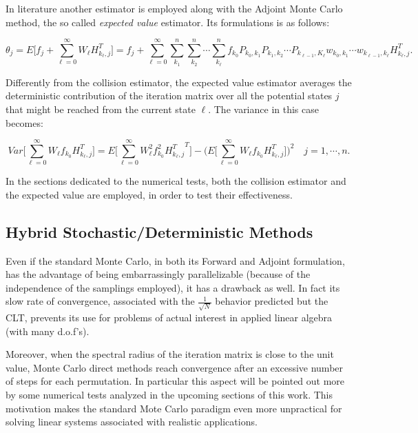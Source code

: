 In literature another estimator is employed along with the Adjoint Monte Carlo
method, the so called \textit{expected value} estimator. Its
formulations is as follows:

\begin{equation}
\theta_j=E\bigg[f_j + \sum_{\ell=0}^\infty
W_{\ell}H_{k_{\ell}, j}^T\bigg]=f_j
+ \sum_{\ell=0}^{\infty}\sum_{k_1}^n\sum_{k_2} ^n\cdots\sum_ { k_ { \ell}}^n
f_{k_0}P_{k_0,k_1}P_{k_1,k_2}\cdots P_{k_{\ell-1},K_{\ell}}w_{k_0,k_1}\cdots
w_{k_{\ell-1},k_{\ell}}H_{k_{\ell},j}^T.
\label{adj_mean1}
\end{equation}

Differently from the collision estimator, the expected value estimator averages
the deterministic contribution of the iteration matrix over all the potential
states $j$ that might be reached from the current state $\ell$. The variance
in this case becomes:

\begin{equation}
Var\bigg [\sum_{\ell=0}^\infty W_{\ell}
f_{k_0}H_{k_{\ell},j}^T\bigg]=E\bigg[\sum_{\ell=0}^\infty W_{\ell}^2
f_{k_0}^2 {H_{k_{\ell},j}^T}^T\bigg ] - \bigg (E\bigg[\sum_{\ell=0}^\infty
W_{\ell}
f_{k_0}H_{k_{\ell},j}^T\bigg]\bigg )^2\quad j=1,\cdots,n
\label{adj_var}.
\end{equation}

In the sections dedicated to the numerical tests, both the collision estimator
and the expected value are employed, in order to test their effectiveness.

\subsection{Hybrid Stochastic/Deterministic Methods}

Even if the standard Monte Carlo, in both its Forward and Adjoint formulation,
has the advantage of being embarrassingly parallelizable (because of the
independence of the samplings employed), it has a drawback as
well. In fact its slow rate of convergence, associated with the
$\frac{1}{\sqrt{N}}$ behavior predicted but the CLT, prevents its use for
problems of actual interest in applied linear algebra (with many d.o.f's).

Moreover, when the spectral radius of the iteration matrix is close to the
unit
value, Monte Carlo direct methods reach convergence after an excessive number
of steps for each
permutation. In particular this aspect will be pointed out more by some
numerical tests analyzed in the upcoming sections of this work.
This motivation makes the standard Mote Carlo paradigm even more
unpractical for solving linear systems associated with realistic applications.
\newline

